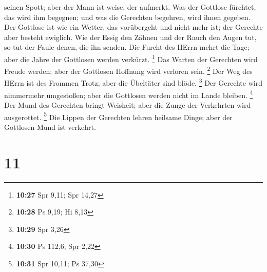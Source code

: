 seinen Spott; aber der Mann ist weise, der aufmerkt.  Was
der Gottlose fürchtet, das wird ihm begegnen; und was die Gerechten
begehren, wird ihnen gegeben.  Der Gottlose ist wie ein
Wetter, das vorübergeht und nicht mehr ist; der Gerechte aber besteht
ewiglich.  Wie der Essig den Zähnen und der Rauch den
Augen tut, so tut der Faule denen, die ihn senden.  Die
Furcht des HErrn mehrt die Tage; aber die Jahre der Gottlosen werden
verkürzt. \footnote{\textbf{10:27} Spr 9,11; Spr 14,27} 
Das Warten der Gerechten wird Freude werden; aber der Gottlosen Hoffnung
wird verloren sein. \footnote{\textbf{10:28} Ps 9,19; Hi 8,13}
 Der Weg des HErrn ist des Frommen Trotz; aber die
Übeltäter sind blöde. \footnote{\textbf{10:29} Spr 3,26} 
Der Gerechte wird nimmermehr umgestoßen; aber die Gottlosen werden nicht
im Lande bleiben. \footnote{\textbf{10:30} Ps 112,6; Spr 2,22}
 Der Mund des Gerechten bringt Weisheit; aber die Zunge
der Verkehrten wird ausgerottet. \footnote{\textbf{10:31} Spr 10,11; Ps
  37,30}  Die Lippen der Gerechten lehren heilsame Dinge;
aber der Gottlosen Mund ist verkehrt.

\hypertarget{section-10}{%
\section{11}\label{section-10}}


